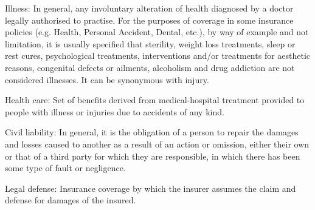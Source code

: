 \documentclass[review]{elsarticle}
\begin{document}
Illness: In general, any involuntary alteration of health diagnosed by a doctor legally authorised to practise. For the purposes of coverage in some insurance policies (e.g. Health, Personal Accident, Dental, etc.), by way of example and not limitation, it is usually specified that sterility, weight loss treatments, sleep or rest cures, psychological treatments, interventions and/or treatments for aesthetic reasons, congenital defects or ailments, alcoholism and drug addiction are not considered illnesses. It can be synonymous with injury.

Health care: Set of benefits derived from medical-hospital treatment provided to people with illness or injuries due to accidents of any kind.

Civil liability: In general, it is the obligation of a person to repair the damages and losses caused to another as a result of an action or omission, either their own or that of a third party for which they are responsible, in which there has been some type of fault or negligence.

Legal defense: Insurance coverage by which the insurer assumes the claim and defense for damages of the insured.
\end{document}
